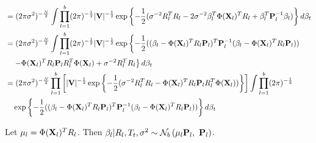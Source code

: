 $$
\begin{aligned}
    & = (2 \pi \sigma^2)^{-\frac{N}{2}} \int \prod_{l = 1}^{b} (2 \pi)^{-\frac{1}{2}} |\mathbf{V}|^{-\frac{1}{2}} \exp \left\{ -\frac{1}{2}(\sigma^{-2}R_{l}^{T}R_{l} - 2\sigma^{-2}\beta_{l}^{T}\Phi(\mathbf{X}_l)^{T}R_{l} + \beta_{l}^{T}\mathbf{P}_{l}^{-1}\beta_{l})\right\} d\beta_{t} \\
    & = (2 \pi \sigma^2)^{-\frac{N}{2}} \int \prod_{l = 1}^{b} (2 \pi)^{-\frac{1}{2}} |\mathbf{V}|^{-\frac{1}{2}} \exp \left\{ -\frac{1}{2}((\beta_{l} - \Phi(\mathbf{X}_l)^{T}R_{l}\mathbf{P}_{l})^{T}\mathbf{P}_{l}^{-1}(\beta_{l} - \Phi(\mathbf{X}_l)^{T}R_{l}\mathbf{P}_{l}))\right. \\
    & \quad \left. - \Phi(\mathbf{X}_l)^{T}R_{l}\mathbf{P}_{l}R_{l}^{T}\Phi(\mathbf{X}_l) + \sigma^{-2}R_{l}^{T}R_{l} \right\} d\beta_{t} \\
    & = (2 \pi \sigma^{2})^{-\frac{N}{2}} \prod_{l = 1}^{b} \left[|\mathbf{V}|^{-\frac{1}{2}} \exp \left\{-\frac{1}{2} (\sigma^{-2}R_{l}^{T}R_{l} - \Phi(\mathbf{X}_l)^{T}R_{l}\mathbf{P}_{l}R_{l}^{T}\Phi(\mathbf{X}_l)) \right\} \right] \int \prod_{l = 1}^{b} (2 \pi)^{-\frac{1}{2}} \\
    & \quad \exp \left\{ -\frac{1}{2}((\beta_{l} - \Phi(\mathbf{X}_l)^{T}R_{l}\mathbf{P}_{l})^{T}\mathbf{P}_{l}^{-1}(\beta_{l} - \Phi(\mathbf{X}_l)^{T}R_{l}\mathbf{P}_{l}))\right\} d\beta_{t} \\
\end{aligned}
$$

Let $\mu_{l} = \Phi(\mathbf{X}_l)^{T}R_{l}$. Then $\beta_{l} \vert R_{l}, T_{t}, \sigma^{2} \sim \mathcal{N}_{b}\left(\mu_{l}\mathbf{P}_{l},~\mathbf{P}_{l}\right)$.


